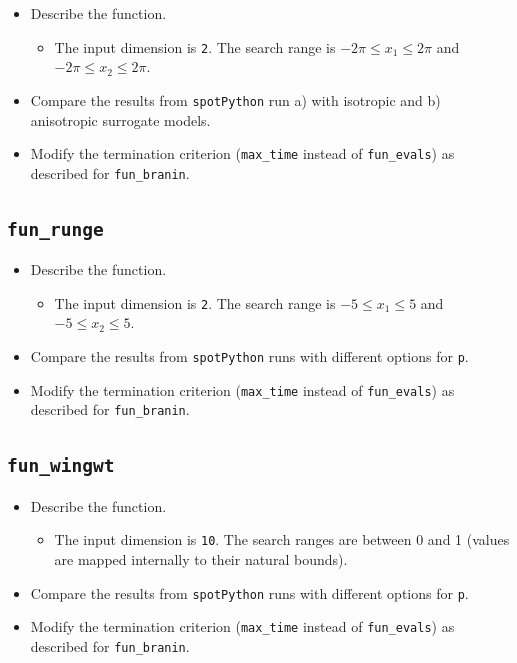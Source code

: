 \documentclass[
  letterpaper,
  DIV=11,
  numbers=noendperiod]{scrreprt}
\providecommand{\tightlist}{%
  \setlength{\itemsep}{0pt}\setlength{\parskip}{0pt}}\usepackage{longtable,booktabs,array}
\begin{document}
\begin{itemize}
\tightlist
\item
  Describe the function.

  \begin{itemize}
  \tightlist
  \item
    The input dimension is \texttt{2}. The search range is
    \(-2\pi \leq x_1 \leq 2\pi\) and \(-2\pi \leq x_2 \leq 2\pi\).
  \end{itemize}
\item
  Compare the results from \texttt{spotPython} run a) with isotropic and
  b) anisotropic surrogate models.
\item
  Modify the termination criterion (\texttt{max\_time} instead of
  \texttt{fun\_evals}) as described for \texttt{fun\_branin}.
\end{itemize}

\subsection{\texorpdfstring{\texttt{fun\_runge}}{fun\_runge}}\label{fun_runge-2}

\begin{itemize}
\tightlist
\item
  Describe the function.

  \begin{itemize}
  \tightlist
  \item
    The input dimension is \texttt{2}. The search range is
    \(-5 \leq x_1 \leq 5\) and \(-5 \leq x_2 \leq 5\).
  \end{itemize}
\item
  Compare the results from \texttt{spotPython} runs with different
  options for \texttt{p}.
\item
  Modify the termination criterion (\texttt{max\_time} instead of
  \texttt{fun\_evals}) as described for \texttt{fun\_branin}.
\end{itemize}

\subsection{\texorpdfstring{\texttt{fun\_wingwt}}{fun\_wingwt}}\label{fun_wingwt}

\begin{itemize}
\tightlist
\item
  Describe the function.

  \begin{itemize}
  \tightlist
  \item
    The input dimension is \texttt{10}. The search ranges are between 0
    and 1 (values are mapped internally to their natural bounds).
  \end{itemize}
\item
  Compare the results from \texttt{spotPython} runs with different
  options for \texttt{p}.
\item
  Modify the termination criterion (\texttt{max\_time} instead of
  \texttt{fun\_evals}) as described for \texttt{fun\_branin}.
\end{itemize}
\end{document}
